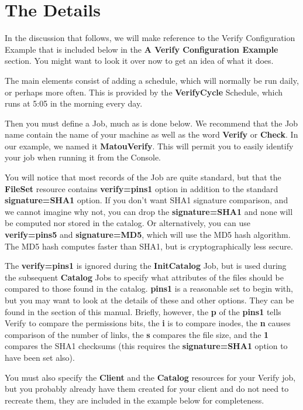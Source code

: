 \section{The Details}

In the discussion that follows, we will make reference to the Verify
Configuration Example that is included below in the {\bf A Verify
Configuration Example} section. You might want to look it over now to get an
idea of what it does.

The main elements consist of adding a schedule, which will normally be run
daily, or perhaps more often. This is provided by the {\bf VerifyCycle}
Schedule, which runs at 5:05 in the morning every day.

Then you must define a Job, much as is done below. We recommend that the Job
name contain the name of your machine as well as the word {\bf Verify} or {\bf
Check}. In our example, we named it {\bf MatouVerify}. This will permit you to
easily identify your job when running it from the Console.

You will notice that most records of the Job are quite standard, but that the
{\bf FileSet} resource contains {\bf verify=pins1} option in addition to the
standard {\bf signature=SHA1} option. If you don't want SHA1 signature
comparison, and we cannot imagine why not, you can drop the {\bf
signature=SHA1} and none will be computed nor stored in the catalog. Or
alternatively, you can use {\bf verify=pins5} and {\bf signature=MD5}, which
will use the MD5 hash algorithm. The MD5 hash computes faster than SHA1, but
is cryptographically less secure.

The {\bf verify=pins1} is ignored during the {\bf InitCatalog} Job, but is
used during the subsequent {\bf Catalog} Jobs to specify what attributes of
the files should be compared to those found in the catalog. {\bf pins1} is a
reasonable set to begin with, but you may want to look at the details of these
and other options. They can be found in the
 section of this manual.
Briefly, however, the {\bf p} of the {\bf pins1} tells Verify to compare the
permissions bits, the {\bf i} is to compare inodes, the {\bf n} causes
comparison of the number of links, the {\bf s} compares the file size, and the
{\bf 1} compares the SHA1 checksums (this requires the {\bf signature=SHA1}
option to have been set also).

You must also specify the {\bf Client} and the {\bf Catalog} resources for
your Verify job, but you probably already have them created for your client
and do not need to recreate them, they are included in the example below for
completeness.

